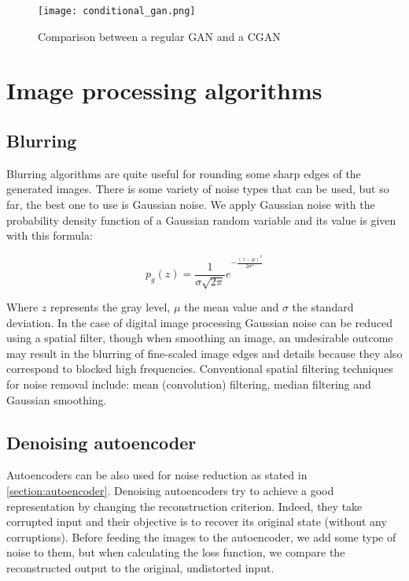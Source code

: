 \documentclass{article}
\begin{document}
\begin{figure}[ht]
    \centering
    \texttt{[image: conditional\_gan.png]}
    \caption{Comparison between a regular GAN and a CGAN}
    \label{fig:cgan}
\end{figure}


\section{Image processing algorithms}

\subsection{Blurring}
Blurring algorithms are quite useful for rounding some sharp edges of the generated images. There is some variety of noise types that can be used, but so far, the best one to use is Gaussian noise. We apply Gaussian noise with the probability density function of a Gaussian random variable and its value is given with this formula:

\begin{equation}
    p_{g}(z) = {\frac{1}{\sigma\sqrt{2\pi}}e}^{-\frac{(z-\mu)^2}{2\sigma^2}}
\end{equation}

Where $z$ represents the gray level, $\mu$ the mean value and $\sigma$ the standard deviation. In the case of digital image processing Gaussian noise can be reduced using a spatial filter, though when smoothing an image, an undesirable outcome may result in the blurring of fine-scaled image edges and details because they also correspond to blocked high frequencies. Conventional spatial filtering techniques for noise removal include: mean (convolution) filtering, median filtering and Gaussian smoothing.

\subsection{Denoising autoencoder}
Autoencoders can be also used for noise reduction as stated in \ref{section:autoencoder}. Denoising autoencoders try to achieve a good representation by changing the reconstruction criterion. Indeed, they take corrupted input and their objective is to recover its original state (without any corruptions). Before feeding the images to the autoencoder, we add some type of noise to them, but when calculating the loss function, we compare the reconstructed output to the original, undistorted input.
\end{document}
